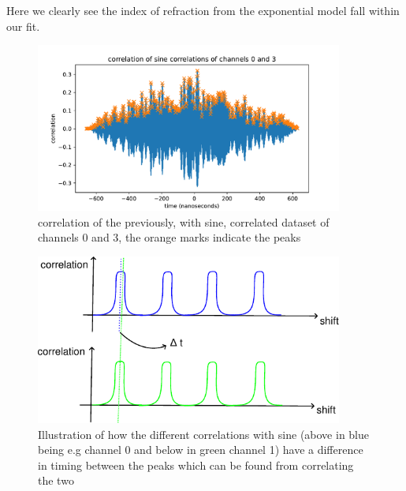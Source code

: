 \documentclass[11pt,a4paper,faculty=we,language=en,doctype=report]{cls/ugent-doc}
\begin{document}
Here we clearly see the index of refraction from the exponential model fall within our fit.
\begin{figure}
	\centering
	\includegraphics[width=0.9\textwidth]{figures/crosscorrelation.pdf}
	\caption{correlation of the previously, with sine, correlated dataset
	of channels 0 and 3, the orange marks indicate the peaks}
	\label{fig:CrossCorr}
\end{figure}
\begin{figure}
	\centering
	\includegraphics[width=0.9\textwidth]{figures/IlluCorr.pdf}
	\caption{Illustration of how the different correlations with sine (above
	in blue being e.g channel 0 and below in green channel 1) have a difference
in timing between the peaks which can be found from correlating the two}
	\label{fig:CorrIllu}
\end{figure}
\end{document}
